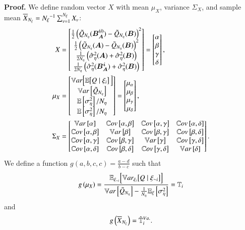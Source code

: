 \textbf{Proof.}
We define random vector $X$ with mean $\mu_X$, variance $\Sigma_X$, and sample mean $\overline{X}_{{N_\xi}} = {N_\xi}^{-1} \sum_{v=1}^{{N_\xi}} X_v$:
\begin{align} \label{eq:t-xmatrix}
    X &= \begin{bmatrix} \frac{1}{2} \left( \tilde{Q}_{{N_\eta}}(\bm{B_A^{(i)}}) - \tilde{Q}_{{N_\eta}}(\bm{B}) \right)^2 \\
                        \frac{1}{2} \left( \tilde{Q}_{{N_\eta}}(\bm{A}) - \tilde{Q}_{{N_\eta}}(\bm{B}) \right)^2 \\
                        \frac{1}{2{N_\eta}} \left( \hat{\sigma}^2_\eta(\bm{A}) + \hat{\sigma}^2_\eta(\bm{B}) \right) \\
                        \frac{1}{2{N_\eta}} \left( \hat{\sigma}^2_\eta(\bm{B_A^i}) + \hat{\sigma}^2_\eta(\bm{B}) \right)
        \end{bmatrix}
        = \begin{bmatrix} \alpha \\ \beta \\ \gamma \\ \delta \end{bmatrix}, \\
    \mu_X &= \begin{bmatrix} \mathbb{V}ar\Bigl[ \mathbb{E}\bigl[Q\mid\xi_i\bigr] \, {} \Bigr] \\ \mathbb{V}ar\left[\tilde{Q}_{{N_\eta}}\right] \\ \mathbb{E}\left[\sigma^2_\eta\right]/{N_\eta} \\ \mathbb{E}\left[\sigma^2_\eta\right]/{N_\eta} \end{bmatrix} 
        = \begin{bmatrix} \mu_\alpha \\ \mu_\beta \\ \mu_\gamma \\ \mu_\delta \end{bmatrix}, \\
    \Sigma_X &= \begin{bmatrix}
        \mathbb{V}ar\left[\alpha\right] & \mathbb{C}ov\left[\alpha,\beta\right] & \mathbb{C}ov\left[\alpha,\gamma\right] & \mathbb{C}ov\left[\alpha,\delta\right] \\ 
        \mathbb{C}ov\left[\alpha,\beta\right] & \mathbb{V}ar\left[\beta\right] & \mathbb{C}ov\left[\beta,\gamma\right] & \mathbb{C}ov\left[\beta,\delta\right] \\
        \mathbb{C}ov\left[\alpha,\gamma\right] & \mathbb{C}ov\left[\beta,\gamma\right] & \mathbb{V}ar\left[\gamma\right] & \mathbb{C}ov\left[\gamma,\delta\right] \\
        \mathbb{C}ov\left[\alpha,\delta\right] & \mathbb{C}ov\left[\beta,\delta\right] & \mathbb{C}ov\left[\gamma,\delta\right] & \mathbb{V}ar\left[\delta\right]
    \end{bmatrix} .
\end{align}
We define a function $g(a,b,c,c)= \frac{a-d}{b - c}$ such that 
\begin{equation}
    g \left( \mu_X \right) = \frac{\mathbb{E}_{\xi_{\sim i}} \Bigl[ \mathbb{V}ar_{\xi_{i}} \bigl[ Q\mid\xi_{\sim i} \bigr] \Bigr]}{\mathbb{V}ar\left[\tilde{Q}_{{N_\eta}}\right] - \frac{1}{{N_\eta}}\mathbb{E}_\xi\left[\sigma^2_\eta\right]} = \mathbb{T}_{i} 
\end{equation} and
\begin{equation}
    g \left( \overline{X}_{{N_\xi}} \right) = \hat{\mathbb{T}}_{i}^{Va.} .
\end{equation}

